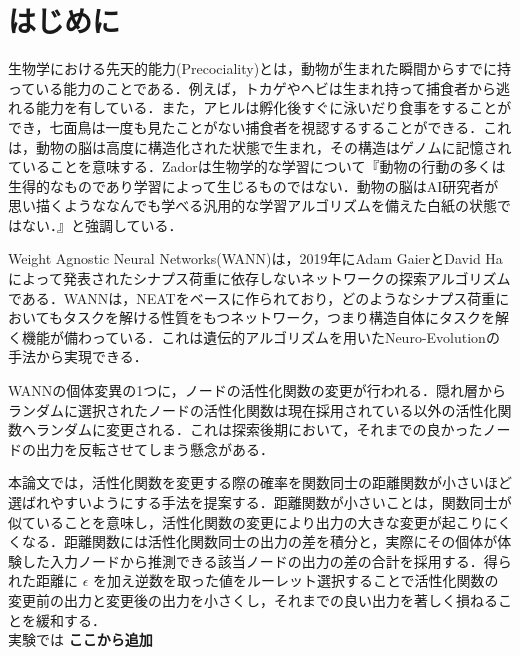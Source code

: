 \section{はじめに}
生物学における先天的能力(Precociality)とは，動物が生まれた瞬間からすでに持っている能力のことである．例えば，トカゲやヘビは生まれ持って捕食者から逃れる能力を有している．また，アヒルは孵化後すぐに泳いだり食事をすることができ，七面鳥は一度も見たことがない捕食者を視認するすることができる．これは，動物の脳は高度に構造化された状態で生まれ，その構造はゲノムに記憶されていることを意味する．Zadorは生物学的な学習について『動物の行動の多くは生得的なものであり学習によって生じるものではない．動物の脳はAI研究者が思い描くようななんでも学べる汎用的な学習アルゴリズムを備えた白紙の状態ではない．』と強調している\cite{先天的能力}．


Weight Agnostic Neural Networks(WANN)は，2019年にAdam GaierとDavid Haによって発表されたシナプス荷重に依存しないネットワークの探索アルゴリズムである\cite{WANN}．WANNは，NEAT\cite{NEAT}をベースに作られており，どのようなシナプス荷重においてもタスクを解ける性質をもつネットワーク，つまり構造自体にタスクを解く機能が備わっている．これは遺伝的アルゴリズム\cite{遺伝的アルゴリズム}を用いたNeuro-Evolution\cite{NE}の手法から実現できる．


WANNの個体変異の1つに，ノードの活性化関数の変更が行われる．隠れ層からランダムに選択されたノードの活性化関数は現在採用されている以外の活性化関数へランダムに変更される．これは探索後期において，それまでの良かったノードの出力を反転させてしまう懸念がある．


本論文では，活性化関数を変更する際の確率を関数同士の距離関数が小さいほど選ばれやすいようにする手法を提案する．距離関数が小さいことは，関数同士が似ていることを意味し，活性化関数の変更により出力の大きな変更が起こりにくくなる．距離関数には活性化関数同士の出力の差を積分と，実際にその個体が体験した入力ノードから推測できる該当ノードの出力の差の合計を採用する．得られた距離に $ \epsilon $ を加え逆数を取った値をルーレット選択することで活性化関数の変更前の出力と変更後の出力を小さくし，それまでの良い出力を著しく損ねることを緩和する．\\
実験では \textbf{ここから追加}